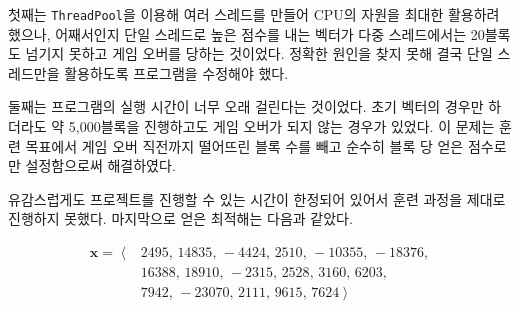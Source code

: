 첫째는 \texttt{ThreadPool}을 이용해 여러 스레드를 만들어 CPU의 자원을 최대한
활용하려 했으나, 어째서인지 단일 스레드로 높은 점수를 내는 벡터가 다중 스레드에서는
20블록도 넘기지 못하고 게임 오버를 당하는 것이었다. 정확한 원인을 찾지 못해 결국 단일 스레드만을
활용하도록 프로그램을 수정해야 했다.

둘째는 프로그램의 실행 시간이 너무 오래 걸린다는 것이었다. 초기 벡터의 경우만 하더라도
약 5,000블록을 진행하고도 게임 오버가 되지 않는 경우가 있었다. 이 문제는 훈련 목표에서
게임 오버 직전까지 떨어뜨린 블록 수를 빼고 순수히 블록 당 얻은 점수로만 설정함으로써
해결하였다.

유감스럽게도 프로젝트를 진행할 수 있는 시간이 한정되어 있어서 훈련 과정을 제대로
진행하지 못했다. 마지막으로 얻은 최적해는 다음과 같았다.

\begin{align*}
    \mathbf{x} = \left<\right.& 2495,\,14835,\,-4424,\,2510,\,-10355,\,-18376, \\
    & 16388,\,18910,\,-2315,\,2528,\,3160,\,6203,\\
    & 7942,\,-23070,\,2111,\,9615,\,7624 \left.\right>
\end{align*}

\newpage